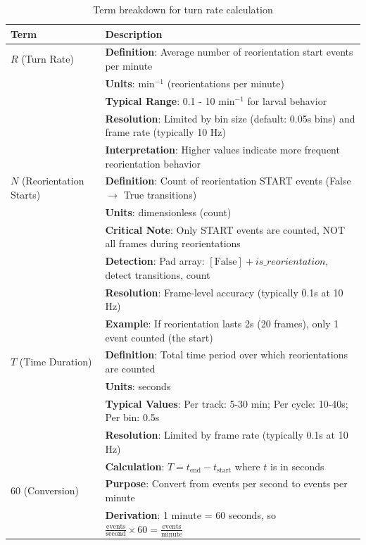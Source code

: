 \documentclass[
  11pt,
]{article}
\begin{document}
\begin{table}[H]
\centering
\small
\begin{tabular}{p{3cm}p{11cm}}
\hline
\textbf{Term} & \textbf{Description} \\
\hline
$R$ (Turn Rate) & \textbf{Definition}: Average number of reorientation start events per minute \\
 & \textbf{Units}: min$^{-1}$ (reorientations per minute) \\
 & \textbf{Typical Range}: 0.1 - 10 min$^{-1}$ for larval behavior \\
 & \textbf{Resolution}: Limited by bin size (default: 0.05s bins) and frame rate (typically 10 Hz) \\
 & \textbf{Interpretation}: Higher values indicate more frequent reorientation behavior \\
\hline
$N$ (Reorientation Starts) & \textbf{Definition}: Count of reorientation START events (False $\rightarrow$ True transitions) \\
 & \textbf{Units}: dimensionless (count) \\
 & \textbf{Critical Note}: Only START events are counted, NOT all frames during reorientations \\
 & \textbf{Detection}: Pad array: $[\text{False}] + is\_reorientation$, detect transitions, count \\
 & \textbf{Resolution}: Frame-level accuracy (typically 0.1s at 10 Hz) \\
 & \textbf{Example}: If reorientation lasts 2s (20 frames), only 1 event counted (the start) \\
\hline
$T$ (Time Duration) & \textbf{Definition}: Total time period over which reorientations are counted \\
 & \textbf{Units}: seconds \\
 & \textbf{Typical Values}: Per track: 5-30 min; Per cycle: 10-40s; Per bin: 0.5s \\
 & \textbf{Resolution}: Limited by frame rate (typically 0.1s at 10 Hz) \\
 & \textbf{Calculation}: $T = t_{\text{end}} - t_{\text{start}}$ where $t$ is in seconds \\
\hline
60 (Conversion) & \textbf{Purpose}: Convert from events per second to events per minute \\
 & \textbf{Derivation}: 1 minute = 60 seconds, so $\frac{\text{events}}{\text{second}} \times 60 = \frac{\text{events}}{\text{minute}}$ \\
\hline
\end{tabular}
\caption{Term breakdown for turn rate calculation}

\end{table}
\end{document}
